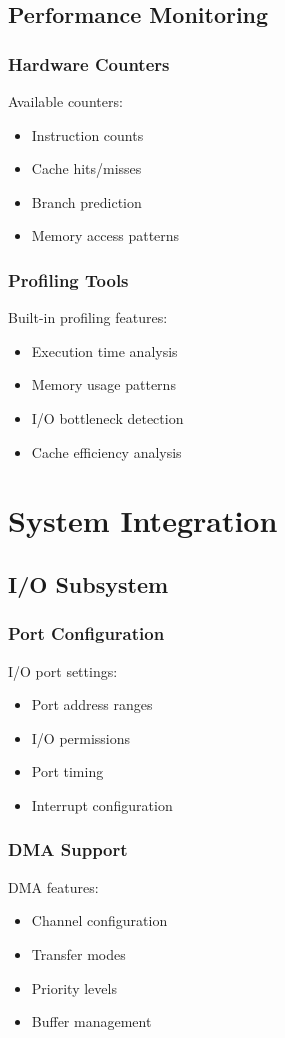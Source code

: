 \documentclass[a4paper,11pt]{book}
\begin{document}
\section{Performance Monitoring}
\subsection{Hardware Counters}
Available counters:
\begin{itemize}
    \item Instruction counts
    \item Cache hits/misses
    \item Branch prediction
    \item Memory access patterns
\end{itemize}

\subsection{Profiling Tools}
Built-in profiling features:
\begin{itemize}
    \item Execution time analysis
    \item Memory usage patterns
    \item I/O bottleneck detection
    \item Cache efficiency analysis
\end{itemize}

\chapter{System Integration}
\section{I/O Subsystem}
\subsection{Port Configuration}
I/O port settings:
\begin{itemize}
    \item Port address ranges
    \item I/O permissions
    \item Port timing
    \item Interrupt configuration
\end{itemize}

\subsection{DMA Support}
DMA features:
\begin{itemize}
    \item Channel configuration
    \item Transfer modes
    \item Priority levels
    \item Buffer management
\end{itemize}
\end{document}
